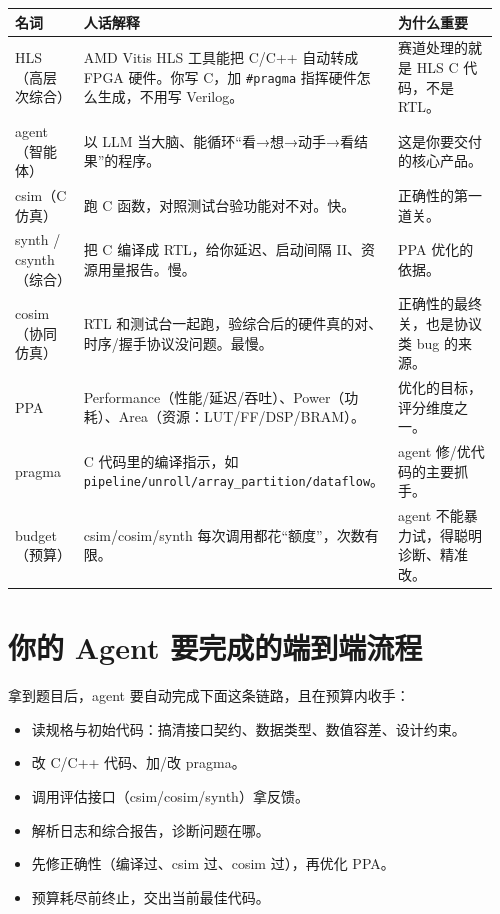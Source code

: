 \documentclass[12pt,a4paper]{ctexbook}
\begin{document}
\begin{longtable}{@{}p{0.16\linewidth}p{0.50\linewidth}p{0.30\linewidth}@{}}
\toprule
\textbf{名词} & \textbf{人话解释} & \textbf{为什么重要} \\
\midrule
\endhead
HLS（高层次综合） & AMD Vitis HLS 工具能把 C/C++ 自动转成 FPGA 硬件。你写 C，加 \texttt{\#pragma} 指挥硬件怎么生成，不用写 Verilog。 & 赛道处理的就是 HLS C 代码，不是 RTL。 \\
agent（智能体） & 以 LLM 当大脑、能循环“看→想→动手→看结果”的程序。 & 这是你要交付的核心产品。 \\
csim（C 仿真） & 跑 C 函数，对照测试台验功能对不对。快。 & 正确性的第一道关。 \\
synth / csynth（综合） & 把 C 编译成 RTL，给你延迟、启动间隔 II、资源用量报告。慢。 & PPA 优化的依据。 \\
cosim（协同仿真） & RTL 和测试台一起跑，验综合后的硬件真的对、时序/握手协议没问题。最慢。 & 正确性的最终关，也是协议类 bug 的来源。 \\
PPA & Performance（性能/延迟/吞吐）、Power（功耗）、Area（资源：LUT/FF/DSP/BRAM）。 & 优化的目标，评分维度之一。 \\
pragma & C 代码里的编译指示，如 \texttt{pipeline/unroll/array\_partition/dataflow}。 & agent 修/优代码的主要抓手。 \\
budget（预算） & csim/cosim/synth 每次调用都花“额度”，次数有限。 & agent 不能暴力试，得聪明诊断、精准改。 \\
\bottomrule
\end{longtable}

\section{你的 Agent 要完成的端到端流程}

拿到题目后，agent 要自动完成下面这条链路，且在预算内收手：

\begin{itemize}
\item 读规格与初始代码：搞清接口契约、数据类型、数值容差、设计约束。
\item 改 C/C++ 代码、加/改 pragma。
\item 调用评估接口（csim/cosim/synth）拿反馈。
\item 解析日志和综合报告，诊断问题在哪。
\item 先修正确性（编译过、csim 过、cosim 过），再优化 PPA。
\item 预算耗尽前终止，交出当前最佳代码。
\end{itemize}
\end{document}
